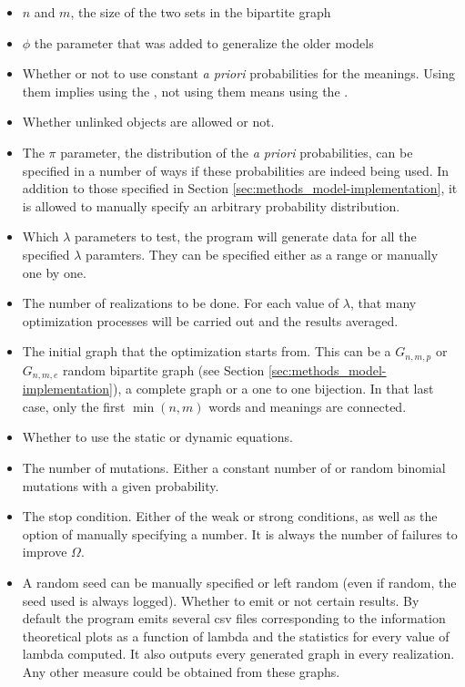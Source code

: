 \begin{itemize}
\item
  $n$ and $m$, the size of the two sets in the bipartite graph
\item
  $\phi$ the parameter that was added to generalize the older models
\item
  Whether or not to use constant \emph{a priori} probabilities for the meanings.
  Using them implies using the \secondmodel{}, not using them means using the \firstmodel{}.
\item
  Whether unlinked objects are allowed or not.
\item
  The $\pi$ parameter, the distribution of the \emph{a priori} probabilities, can be specified in a number of ways if these probabilities are indeed being used.
  In addition to those specified in Section \ref{sec:methods_model-implementation}, it is allowed to manually specify an arbitrary probability distribution.
\item
  Which $\lambda$ parameters to test, the program will generate data for all the specified $\lambda$ paramters.
 They can be specified either as a range or manually one by one.
\item
  The number of realizations to be done.
  For each value of $\lambda$, that many optimization processes will be carried out and the results averaged.
\item
  The initial graph that the optimization starts from.
  This can be a $G_{n,m,p}$ or $G_{n,m,e}$ random bipartite graph (see Section \ref{sec:methods_model-implementation}), a complete graph or a one to one bijection.
  In that last case, only the first $\min(n,m)$ words and meanings are connected.
\item
  Whether to use the static or dynamic equations.
\item
  The number of mutations.
  Either a constant number of or random binomial mutations with a given probability.
\item
  The stop condition.
  Either of the weak or strong conditions, as well as the option of manually specifying a number.
  It is always the number of failures to improve $\Omega$.
\item
  A random seed can be manually specified or left random (even if random, the seed used is always logged).
  Whether to emit or not certain results.
  By default the program emits several csv files corresponding to the information theoretical plots as a function of lambda and the statistics for every value of lambda computed.
  It also outputs every generated graph in every realization.
  Any other measure could be obtained from these graphs.
\end{itemize}

